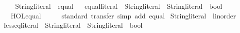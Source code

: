 \begin{isabellebody}
\isadelimproof
\ %
\endisadelimproof
%
\isatagproof
\isacommand{{\isachardot}{\kern0pt}}\isamarkupfalse%
%
\endisatagproof
{\isafoldproof}%
%
\isadelimproof
%
\endisadelimproof
\isanewline
\isanewline
{}\isamarkupfalse%
\isanewline
\isanewline
{}\isamarkupfalse%
%
\isadelimproof
\ %
\endisadelimproof
%
\isatagproof
\isacommand{{\isachardot}{\kern0pt}{\isachardot}{\kern0pt}}\isamarkupfalse%
%
\endisatagproof
{\isafoldproof}%
%
\isadelimproof
%
\endisadelimproof
\isanewline
\isanewline
{}\isamarkupfalse%
\isanewline
\isanewline
{}\isamarkupfalse%
\ String{\isachardot}{\kern0pt}literal\ {\isacharcolon}{\kern0pt}{\isacharcolon}{\kern0pt}\ equal\isanewline
{}\isanewline
\isanewline
{}\isamarkupfalse%
\isanewline
{}\isanewline
\isanewline
{}\ \isamarkupfalse%
\ equal{\isacharunderscore}{\kern0pt}literal\ {\isacharcolon}{\kern0pt}{\isacharcolon}{\kern0pt}\ {\isachardoublequoteopen}String{\isachardot}{\kern0pt}literal\ {\isasymRightarrow}\ String{\isachardot}{\kern0pt}literal\ {\isasymRightarrow}\ bool{\isachardoublequoteclose}\isanewline
\ \ \ HOL{\isachardot}{\kern0pt}equal%
\isadelimproof
\ %
\endisadelimproof
%
\isatagproof
\isacommand{{\isachardot}{\kern0pt}}\isamarkupfalse%
%
\endisatagproof
{\isafoldproof}%
%
\isadelimproof
%
\endisadelimproof
\isanewline
\isanewline
{}\isamarkupfalse%
\isanewline
%
\isadelimproof
\ \ %
\endisadelimproof
%
\isatagproof
{}\isamarkupfalse%
\ {\isacharparenleft}{\kern0pt}standard{\isacharsemicolon}{\kern0pt}\ transfer{\isacharparenright}{\kern0pt}\ {\isacharparenleft}{\kern0pt}simp\ add{\isacharcolon}{\kern0pt}\ equal{\isacharparenright}{\kern0pt}%
\endisatagproof
{\isafoldproof}%
%
\isadelimproof
\isanewline
%
\endisadelimproof
\isanewline
{}\isamarkupfalse%
\isanewline
\isanewline
{}\isamarkupfalse%
\isanewline
\isanewline
{}\isamarkupfalse%
\ String{\isachardot}{\kern0pt}literal\ {\isacharcolon}{\kern0pt}{\isacharcolon}{\kern0pt}\ linorder\isanewline
{}\isanewline
\isanewline
{}\isamarkupfalse%
\isanewline
{}\isanewline
\isanewline
{}\ \isamarkupfalse%
\ less{\isacharunderscore}{\kern0pt}eq{\isacharunderscore}{\kern0pt}literal\ {\isacharcolon}{\kern0pt}{\isacharcolon}{\kern0pt}\ {\isachardoublequoteopen}String{\isachardot}{\kern0pt}literal\ {\isasymRightarrow}\ String{\isachardot}{\kern0pt}literal\ {\isasymRightarrow}\ bool{\isachardoublequoteclose}\isanewline

\end{isabellebody}
